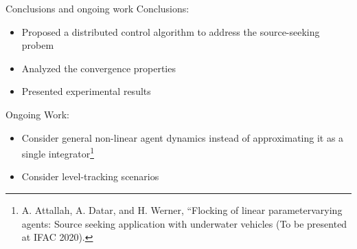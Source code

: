 \begin{frame}{Conclusions and ongoing work}
Conclusions:
\begin{itemize}
    \item Proposed a distributed control algorithm to address the source-seeking probem
    \item Analyzed the convergence properties
    \item Presented experimental results
\end{itemize}
Ongoing Work:
\begin{itemize}
    \item Consider general non-linear agent dynamics instead of approximating it as a single integrator\footnote{A.  Attallah,  A.  Datar,  and  H.  Werner,  “Flocking  of  linear  parametervarying agents: Source seeking application with underwater vehicles (To be presented at IFAC 2020).}
    \item Consider level-tracking scenarios
\end{itemize}
\end{frame}
